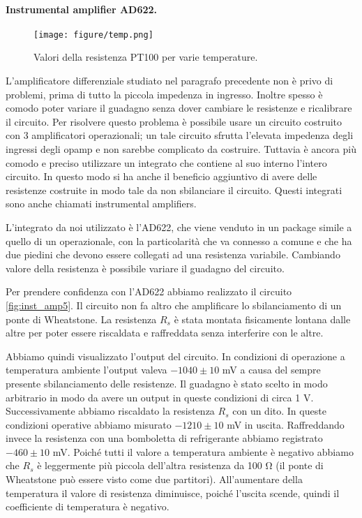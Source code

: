 \paragraph{Instrumental amplifier AD622.}

\begin{figure*}[t]
    \texttt{[image: figure/temp.png]}
    \caption{Valori della resistenza PT100 per varie temperature.}
    \label{fig:temp5}
\end{figure*}

L'amplificatore differenziale studiato nel paragrafo precedente non è privo di problemi, prima di tutto la piccola impedenza
in ingresso. Inoltre spesso è comodo poter variare il guadagno senza dover cambiare le resistenze e ricalibrare il circuito.
Per risolvere questo problema è possibile usare un circuito costruito con 3 amplificatori operazionali; un tale circuito sfrutta
l'elevata impedenza degli ingressi degli opamp e non sarebbe complicato da costruire. Tuttavia è ancora più comodo e preciso
utilizzare un integrato che contiene al suo interno l'intero circuito. In questo modo si ha anche il beneficio aggiuntivo di avere
delle resistenze costruite in modo tale da non sbilanciare il circuito. Questi integrati sono anche chiamati instrumental amplifiers.

L'integrato da noi utilizzato è l'AD622, che viene venduto in un package simile a quello di un operazionale,
con la particolarità che va connesso a comune e che ha due piedini che devono essere collegati ad una resistenza
variabile. Cambiando valore della resistenza è possibile variare il guadagno del circuito.

Per prendere confidenza con l'AD622 abbiamo realizzato il circuito \ref{fig:inst_amp5}. Il circuito non fa altro che
amplificare lo sbilanciamento di un ponte di Wheatstone. La resistenza $R_s$ è stata montata fisicamente lontana
dalle altre per poter essere riscaldata e raffreddata senza interferire con le altre.

Abbiamo quindi visualizzato l'output del circuito. In condizioni di operazione a temperatura ambiente l'output valeva
$- 1040 \pm 10$ mV a causa del sempre presente sbilanciamento delle resistenze. Il guadagno è stato scelto in modo arbitrario
in modo da avere un output in queste condizioni di circa 1 V. Successivamente abbiamo riscaldato la resistenza $R_s$
con un dito. In queste condizioni operative abbiamo misurato $- 1210 \pm 10$ mV in uscita. Raffreddando invece la resistenza
con una bomboletta di refrigerante abbiamo registrato $-460 \pm 10$ mV. Poiché tutti il valore a temperatura ambiente
è negativo abbiamo che $R_s$ è leggermente più piccola dell'altra resistenza da 100 \si{\ohm} (il ponte di Wheatstone
può essere visto come due partitori). All'aumentare della temperatura il valore di resistenza diminuisce, poiché
l'uscita scende, quindi il coefficiente di temperatura è negativo.

